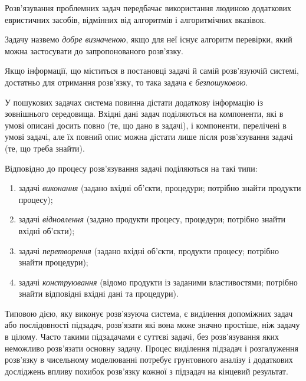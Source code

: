 Розв'язування проблемних задач передбачає використання людиною додаткових евристичних засобів, відмінних від алгоритмів і алгоритмічних вказівок.

\begin{definition}
    Задачу назвемо \textit{добре визначеною}, якщо для неї існує алгоритм перевірки, який можна застосувати до запропонованого розв'язку.
\end{definition}

\begin{definition}
    Якщо інформації, що міститься в постановці задачі й самій розв'язую\-чій системі, достатньо для отримання розв'язку, то така задача є \textit{безпошуковою}.
\end{definition}

У пошукових задачах система повинна дістати додаткову інформацію із зовнішнього середовища. Вхідні дані задач поділяються на компоненти, які в умові описані досить повно (те, що дано в задачі), і компоненти, перелічені в умові задачі, але їх повний опис можна дістати лише після розв'язування задачі (те, що треба знайти). \medskip

Відповідно до процесу розв'язування задачі поділяються на такі типи:
\begin{enumerate}
    \item задачі \textit{виконання} (задано вхідні об'єкти, процедури; потрібно знайти продукти процесу);
    \item задачі \textit{відновлення} (задано продукти процесу, процедури; потрібно знайти вхідні об'єкти);
    \item задачі \textit{перетворення} (задано вхідні об'єкти, продукти процесу; потрібно знайти процедури);
    \item задачі \textit{конструювання} (відомо продукти із заданими властивостями; потрібно знайти відповідні вхідні дані та процедури).
\end{enumerate}
 
\begin{remark}
    Типовою дією, яку виконує розв'язуюча система, є виділення допоміжних задач або послідовності підзадач, розв'язати які вона може значно простіше, ніж задачу в цілому. Часто такими підзадачами є суттєві задачі, без розв'язування яких неможливо розв'язати основну задачу. Процес виділення підзадач і розгалуження розв'язку в чисельному моделюванні потребує грунтовного аналізу і додаткових досліджень впливу похибок розв'язку кожної з підзадач на кінцевий результат.
\end{remark}


